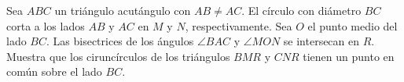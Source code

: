 Sea $ABC$ un triángulo acutángulo con $AB\neq AC$. El círculo con diámetro $BC$ corta a los lados $AB$ y $AC$ en $M$ y $N$, respectivamente. Sea $O$ el punto medio del lado $BC$. Las bisectrices de los ángulos $\angle BAC$ y $\angle MON$ se intersecan en $R$. Muestra que los ciruncírculos de los triángulos $BMR$ y $CNR$ tienen un punto en común sobre el lado $BC$.